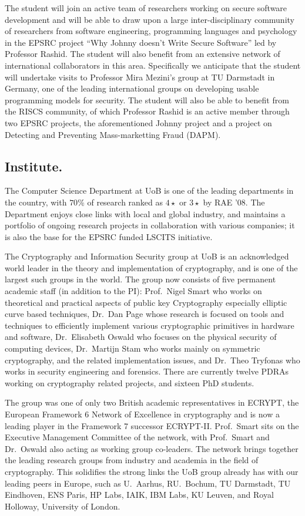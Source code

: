 \documentclass[10pt]{article}
\begin{document}
The student will join an active team of researchers working on secure software development and will be able to draw upon a large inter-disciplinary community of researchers from software engineering, programming languages and psychology in the EPSRC project ``Why Johnny doesn't Write Secure Software'' led by Professor Rashid. The student will also benefit from an extensive network of international collaborators in this area. Specifically we anticipate that the student will undertake visits to Professor Mira Mezini's group at TU Darmstadt in Germany, one of the leading international groups on developing usable programming models for security. The student will also be able to benefit from the RISCS community, of which Professor Rashid is an active member through two EPSRC projects, the aforementioned Johnny project and a project on Detecting and Preventing Mass-marketting Fraud (DAPM).

\iffalse
\subsection*{Institute.}
The Computer Science Department at UoB is one of
the leading departments in the country, with $70$\% of research ranked as
$4\star$ or $3\star$ by RAE '08.
The Department enjoys close links with local and global industry, and maintains
a portfolio of ongoing research projects in collaboration with various
companies; it is also the base for the EPSRC funded LSCITS initiative.

The Cryptography and Information Security group at UoB is an acknowledged
world leader in the theory and implementation of cryptography, and is
one of the largest such groups in the world.
The group now consists of five permanent academic staff (in
addition to the PI): 
Prof.~Nigel Smart who works on theoretical and practical aspects of public key 
Cryptography especially elliptic curve based techniques, 
Dr.~Dan Page whose research is focused on tools and techniques to efficiently 
implement various cryptographic primitives in hardware and software, 
Dr.~Elisabeth Oswald who focuses on the physical security of computing devices, 
Dr.~Martijn Stam who works mainly on symmetric cryptography,  
and the related implementation issues, and 
Dr.~Theo Tryfonas who works in security engineering and forensics.
There are currently twelve PDRAs working on cryptography related projects, 
and sixteen PhD students.



The group was one of only two British academic representatives in ECRYPT, 
the European Framework 6 Network of Excellence in cryptography and is now a leading player in the Framework 7 successor  ECRYPT-II. 
Prof.~Smart sits on the Executive Management Committee of the network,
with Prof.~Smart and Dr.~Oswald also acting as working group co-leaders.
The network brings together the leading research groups from industry
and academia in the field of cryptography.
This solidifies the strong links the UoB group already has with our
leading peers in Europe, such as U.~Aarhus, RU.~Bochum, TU Darmstadt, TU Eindhoven, 
ENS Paris, HP Labs, IAIK, IBM Labs, KU Leuven, and Royal Holloway, University of London.
\end{document}
